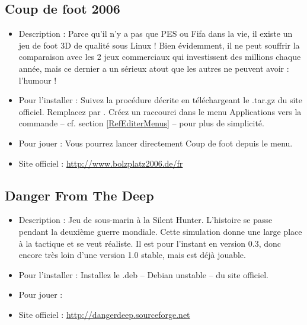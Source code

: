 \subsection{Coup de foot 2006}
\begin{itemize}
\begingroup
{}
\item Description : Parce qu'il n'y a pas que PES ou Fifa dans la vie, il existe un jeu  de foot 3D de qualité sous Linux ! Bien évidemment, il ne peut souffrir la comparaison avec les 2 jeux commerciaux qui investissent des millions chaque année, mais ce dernier a un sérieux atout que les autres ne peuvent avoir : l'humour !{\par}
\endgroup
\item Pour l'installer : Suivez la procédure décrite en téléchargeant le .tar.gz du site officiel. Remplacez  par . Créez un raccourci dans le menu Applications vers la commande  -- cf. section \ref{RefEditerMenus} -- pour plus de simplicité.{\par}
\item Pour jouer : Vous pourrez lancer directement Coup de foot depuis le menu.{\par}
\item Site officiel : \url{http://www.bolzplatz2006.de/fr}{\par}
\end{itemize}
\subsection{Danger From The Deep}
\begin{itemize}
\begingroup
{}
\item Description : Jeu de sous-marin à la Silent Hunter. L'histoire se passe pendant la deuxième guerre mondiale. Cette simulation donne une large place à la tactique et se veut réaliste. Il est pour l'instant en version 0.3, donc encore très loin d'une version 1.0 stable, mais est déjà jouable.{\par}
\endgroup
\item Pour l'installer : Installez le .deb -- Debian unstable -- du site officiel.{\par}
\item Pour jouer : 
\item Site officiel : \url{http://dangerdeep.sourceforge.net}{\par}
\end{itemize}
\newpage
